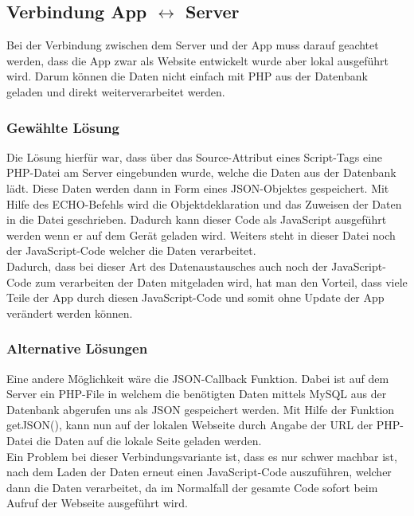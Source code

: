 \subsection{Verbindung App $ \leftrightarrow $ Server}

Bei der Verbindung zwischen dem Server und der App muss darauf geachtet werden, dass die App zwar als Website entwickelt wurde aber lokal ausgeführt wird. Darum können die Daten nicht einfach mit PHP aus der Datenbank geladen und direkt weiterverarbeitet werden.\\

\subsubsection{Gewählte Lösung}
Die Lösung hierfür war, dass über das Source-Attribut eines Script-Tags eine PHP-Datei am Server eingebunden wurde, welche die Daten aus der Datenbank lädt. Diese Daten werden dann in Form eines JSON-Objektes gespeichert. Mit Hilfe des ECHO-Befehls wird die Objektdeklaration und das Zuweisen der Daten in die Datei geschrieben. Dadurch kann dieser Code als JavaScript ausgeführt werden wenn er auf dem Gerät geladen wird. Weiters steht in dieser Datei noch der JavaScript-Code welcher die Daten verarbeitet.\\
Dadurch, dass bei dieser Art des Datenaustausches auch noch der JavaScript-Code zum verarbeiten der Daten mitgeladen wird, hat man den Vorteil, dass viele Teile der App durch diesen JavaScript-Code und somit ohne Update der App verändert werden können.\\

\subsubsection{Alternative Lösungen}
Eine andere Möglichkeit wäre die JSON-Callback Funktion. Dabei ist auf dem Server ein PHP-File in welchem die benötigten Daten mittels MySQL aus der Datenbank abgerufen uns als JSON gespeichert werden. 
Mit Hilfe der Funktion getJSON(), kann nun auf der lokalen Webseite durch Angabe der URL der PHP-Datei die Daten auf die lokale Seite geladen werden.\\
Ein Problem bei dieser Verbindungsvariante ist, dass es nur schwer machbar ist, nach dem Laden der Daten erneut einen JavaScript-Code auszuführen, welcher dann die Daten verarbeitet, da im Normalfall der gesamte Code sofort beim Aufruf der Webseite ausgeführt wird.\\

%
